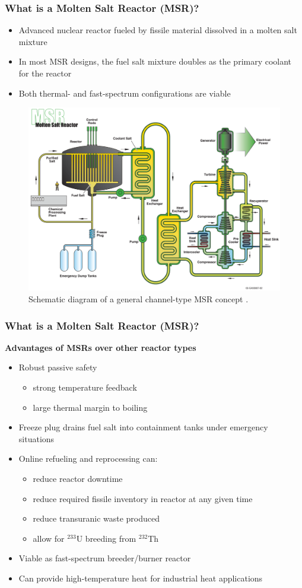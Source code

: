 \begin{frame}
  \frametitle{What is a Molten Salt Reactor (MSR)?}
	\begin{itemize}
	  \item Advanced nuclear reactor fueled by fissile
		material dissolved in a molten salt mixture
	  \item In most MSR designs, the fuel salt mixture doubles as the primary coolant for the
        reactor
	  \item Both thermal- and fast-spectrum configurations are viable
	\end{itemize}
	\begin{figure}
	  \centering
	  \includegraphics[width=.5\textwidth]{./images/msr}
      \caption{Schematic diagram of a general channel-type MSR concept
      \cite{u.s._doe_nuclear_energy_research_advisory_committee_technology_2002}.}
	  \label{fig:msr}
	\end{figure}
\end{frame}

\begin{frame}
  \frametitle{What is a Molten Salt Reactor (MSR)?}
  \textbf{Advantages of MSRs over other reactor types}
  \begin{itemize}
    \item Robust passive safety
      \begin{itemize}
        \item strong temperature feedback
        \item large thermal margin to boiling
      \end{itemize}
    \item Freeze plug drains fuel salt into containment tanks under emergency situations
    \item Online refueling and reprocessing can:
      \begin{itemize}
        \item reduce reactor downtime
        \item reduce required fissile inventory in reactor at any given time
        \item reduce transuranic waste produced
        \item allow for $^{233}$U breeding from $^{232}$Th
      \end{itemize}
    \item Viable as fast-spectrum breeder/burner reactor
    \item Can provide high-temperature heat for industrial heat applications
  \end{itemize}
\end{frame}

